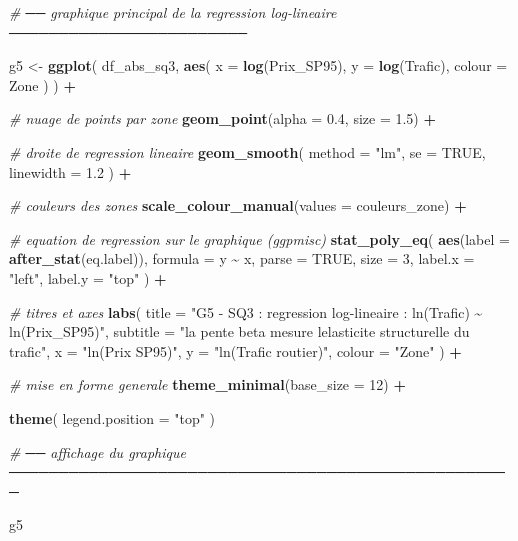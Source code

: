 \documentclass[
]{article}
\newenvironment{Shaded}{\begin{snugshade}}{\end{snugshade}}
\newcommand{\AttributeTok}[1]{\textcolor[rgb]{0.13,0.29,0.53}{#1}}
\newcommand{\CommentTok}[1]{\textcolor[rgb]{0.56,0.35,0.01}{\textit{#1}}}
\newcommand{\ConstantTok}[1]{\textcolor[rgb]{0.56,0.35,0.01}{#1}}
\newcommand{\DecValTok}[1]{\textcolor[rgb]{0.00,0.00,0.81}{#1}}
\newcommand{\FloatTok}[1]{\textcolor[rgb]{0.00,0.00,0.81}{#1}}
\newcommand{\FunctionTok}[1]{\textcolor[rgb]{0.13,0.29,0.53}{\textbf{#1}}}
\newcommand{\NormalTok}[1]{#1}
\newcommand{\OtherTok}[1]{\textcolor[rgb]{0.56,0.35,0.01}{#1}}
\newcommand{\SpecialCharTok}[1]{\textcolor[rgb]{0.81,0.36,0.00}{\textbf{#1}}}
\newcommand{\StringTok}[1]{\textcolor[rgb]{0.31,0.60,0.02}{#1}}
\begin{document}
\begin{Shaded}
\begin{Highlighting}[]
\CommentTok{\# ── graphique principal de la regression log{-}lineaire ────────────────────────}

\NormalTok{g5 }\OtherTok{\textless{}{-}} \FunctionTok{ggplot}\NormalTok{(}
\NormalTok{  df\_abs\_sq3,}
  \FunctionTok{aes}\NormalTok{(}
    \AttributeTok{x =} \FunctionTok{log}\NormalTok{(Prix\_SP95),}
    \AttributeTok{y =} \FunctionTok{log}\NormalTok{(Trafic),}
    \AttributeTok{colour =}\NormalTok{ Zone}
\NormalTok{  )}
\NormalTok{) }\SpecialCharTok{+}

  \CommentTok{\# nuage de points par zone}
  \FunctionTok{geom\_point}\NormalTok{(}\AttributeTok{alpha =} \FloatTok{0.4}\NormalTok{, }\AttributeTok{size =} \FloatTok{1.5}\NormalTok{) }\SpecialCharTok{+}

  \CommentTok{\# droite de regression lineaire}
  \FunctionTok{geom\_smooth}\NormalTok{(}
    \AttributeTok{method =} \StringTok{"lm"}\NormalTok{,}
    \AttributeTok{se =} \ConstantTok{TRUE}\NormalTok{,}
    \AttributeTok{linewidth =} \FloatTok{1.2}
\NormalTok{  ) }\SpecialCharTok{+}

  \CommentTok{\# couleurs des zones}
  \FunctionTok{scale\_colour\_manual}\NormalTok{(}\AttributeTok{values =}\NormalTok{ couleurs\_zone) }\SpecialCharTok{+}

  \CommentTok{\# equation de regression sur le graphique (ggpmisc)}
  \FunctionTok{stat\_poly\_eq}\NormalTok{(}
    \FunctionTok{aes}\NormalTok{(}\AttributeTok{label =} \FunctionTok{after\_stat}\NormalTok{(eq.label)),}
    \AttributeTok{formula =}\NormalTok{ y }\SpecialCharTok{\textasciitilde{}}\NormalTok{ x,}
    \AttributeTok{parse =} \ConstantTok{TRUE}\NormalTok{,}
    \AttributeTok{size =} \DecValTok{3}\NormalTok{,}
    \AttributeTok{label.x =} \StringTok{"left"}\NormalTok{,}
    \AttributeTok{label.y =} \StringTok{"top"}
\NormalTok{  ) }\SpecialCharTok{+}

  \CommentTok{\# titres et axes}
  \FunctionTok{labs}\NormalTok{(}
    \AttributeTok{title =} \StringTok{"G5 {-} SQ3 : regression log{-}lineaire : ln(Trafic) \textasciitilde{} ln(Prix\_SP95)"}\NormalTok{,}
    \AttributeTok{subtitle =} \StringTok{"la pente beta mesure l\textquotesingle{}elasticite structurelle du trafic"}\NormalTok{,}
    \AttributeTok{x =} \StringTok{"ln(Prix SP95)"}\NormalTok{,}
    \AttributeTok{y =} \StringTok{"ln(Trafic routier)"}\NormalTok{,}
    \AttributeTok{colour =} \StringTok{"Zone"}
\NormalTok{  ) }\SpecialCharTok{+}

  \CommentTok{\# mise en forme generale}
  \FunctionTok{theme\_minimal}\NormalTok{(}\AttributeTok{base\_size =} \DecValTok{12}\NormalTok{) }\SpecialCharTok{+}

  \FunctionTok{theme}\NormalTok{(}
    \AttributeTok{legend.position =} \StringTok{"top"}
\NormalTok{  )}


\CommentTok{\# ── affichage du graphique ───────────────────────────────────────────────────}

\NormalTok{g5}
\end{Highlighting}
\end{Shaded}
\end{document}
